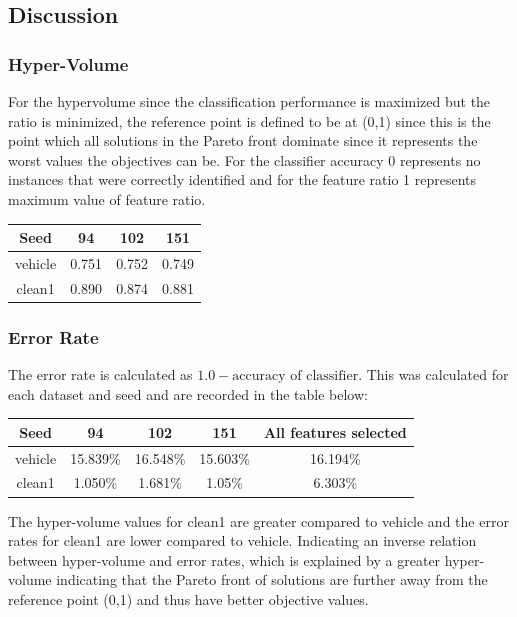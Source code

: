 \documentclass{article}
\begin{document}
\subsection*{Discussion}
\subsubsection*{Hyper-Volume}
For the hypervolume since the classification performance is maximized but the ratio is minimized, the reference point is defined to be at (0,1) since this is the point which all solutions in the Pareto front dominate since it represents the worst values the objectives can be. For the classifier accuracy 0 represents no instances that were correctly identified and for the feature ratio 1 represents maximum value of feature ratio. 
\begin{center}
\begin{tabular}{|c|c|c|c|}
\hline
Seed & 94 & 102 & 151 \\
\hline
vehicle & 0.751 & 0.752 & 0.749 \\
\hline
clean1 & 0.890 & 0.874 & 0.881 \\
\hline
\end{tabular}
\end{center}
\subsubsection*{Error Rate}
The error rate is calculated as $1.0 - \text{accuracy of classifier}$. This was calculated for each dataset and seed and are recorded in the table below: 
\begin{center}
\begin{tabular}{|c|c|c|c|c|}
\hline
Seed & 94 & 102 & 151 & All features selected\\
\hline
vehicle & 15.839\% & 16.548\% & 15.603\% & 16.194\%\\
\hline
clean1 & 1.050\% & 1.681\% & 1.05\% & 6.303\% \\
\hline
\end{tabular}
\end{center}
The hyper-volume values for clean1 are greater compared to vehicle and the error rates for clean1 are lower compared to vehicle. Indicating an inverse relation between hyper-volume and error rates, which is explained by a greater hyper-volume indicating that the Pareto front of solutions are further away from the reference point (0,1) and thus have better objective values.  
\end{document}
